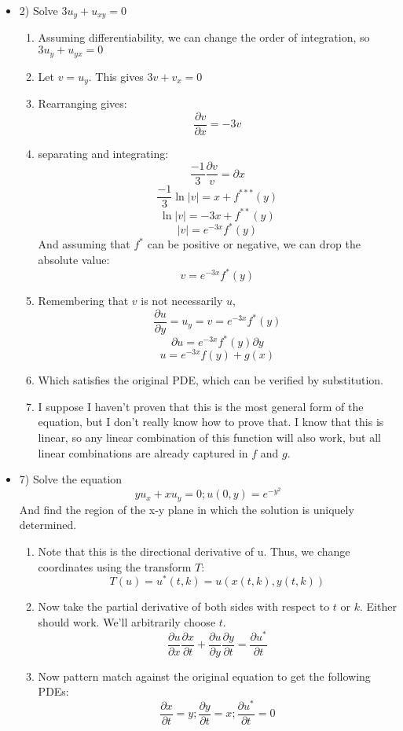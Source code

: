 \documentclass{article}
\begin{document}
\begin{itemize}
\begin{enumerate}
    \end{enumerate}
    
    \newpage
    \item 2) Solve $3u_y + u_{xy} = 0$
    \begin{enumerate}
        \item Assuming differentiability, we can change the order of integration, so $3u_y + u_{yx} = 0$
        \item Let $v = u_y$. This gives $3v + v_x = 0$
        \item Rearranging gives:
        $$\frac{\partial v}{\partial x} = -3v$$
        \item separating and integrating:
        $$\frac{-1}{3}\frac{\partial v}{v} =\partial x$$
        $$\frac{-1}{3}\ln\left| v\right| = x + f^{***}(y)$$
        $$\ln\left| v\right| = -3x + f^{**}(y)$$
        $$\left| v\right| = e^{-3x}f^*(y)$$
        And assuming that $f^*$ can be positive or negative, we can drop the absolute value:
        $$v = e^{-3x}f^*(y)$$
        \item Remembering that $v$ is not necessarily $u$, 
        $$\frac{\partial u}{\partial y} = u_y = v = e^{-3x}f^*(y)$$
        $$\partial u = e^{-3x}f^*(y) \partial y$$
        $$u  = e^{-3x}f(y) + g(x)$$
        \item Which satisfies the original PDE, which can be verified by substitution.
        \item I suppose I haven't proven that this is the most general form of the equation, but I don't really know how to prove that. I know that this is linear, so any linear combination of this function will also work, but all linear combinations are already captured in $f$ and $g$. 
        
    \end{enumerate}
    \newpage
    \item 7) Solve the equation 
    $$yu_x + xu_y = 0; u(0,y) = e^{-y^2}$$
    And find the region of the x-y plane in which the solution is uniquely determined.
    \begin{enumerate}
        \item Note that this is the directional derivative of u.  Thus, we change coordinates using the transform $T$:
        $$T(u) = u^*(t,k) = u(x(t,k),y(t,k))$$
        \item Now take the partial derivative of both sides with respect to $t$ or $k$. Either should work. We'll arbitrarily choose $t$.
        $$\frac{\partial u}{\partial x}\frac{\partial x}{\partial t} + \frac{\partial u}{\partial y}\frac{\partial y}{\partial t} = \frac{\partial u^*}{\partial t}$$
        \item Now pattern match against the original equation to get the following PDEs:
        $$\frac{\partial x}{\partial t} = y;\frac{\partial y}{\partial t} = x;\frac{\partial u^*}{\partial t} = 0$$


\end{enumerate}
\end{itemize}
\end{document}
